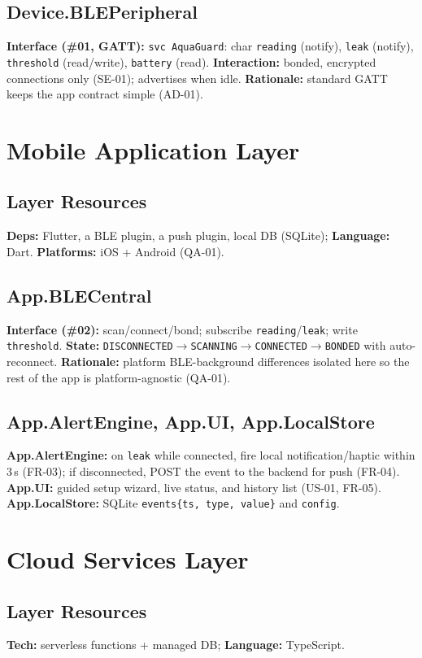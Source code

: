 \documentclass[11pt,letterpaper]{article}
\begin{document}
\subsection{Device.BLEPeripheral}
\textbf{Interface (\#01, GATT):} \texttt{svc AquaGuard}: char \texttt{reading}
(notify), \texttt{leak} (notify), \texttt{threshold} (read/write), \texttt{battery}
(read). \textbf{Interaction:} bonded, encrypted connections only (SE-01); advertises
when idle. \textbf{Rationale:} standard GATT keeps the app contract simple (AD-01).

\section{Mobile Application Layer}
\subsection{Layer Resources}
\textbf{Deps:} Flutter, a BLE plugin, a push plugin, local DB (SQLite);
\textbf{Language:} Dart. \textbf{Platforms:} iOS + Android (QA-01).
\subsection{App.BLECentral}
\textbf{Interface (\#02):} scan/connect/bond; subscribe \texttt{reading}/\texttt{leak};
write \texttt{threshold}. \textbf{State:}
\texttt{DISCONNECTED$\rightarrow$SCANNING$\rightarrow$CONNECTED$\rightarrow$BONDED}
with auto-reconnect. \textbf{Rationale:} platform BLE-background differences isolated
here so the rest of the app is platform-agnostic (QA-01).
\subsection{App.AlertEngine, App.UI, App.LocalStore}
\textbf{App.AlertEngine:} on \texttt{leak} while connected, fire local
notification/haptic within 3\,s (FR-03); if disconnected, POST the event to the
backend for push (FR-04). \textbf{App.UI:} guided setup wizard, live status, and
history list (US-01, FR-05). \textbf{App.LocalStore:} SQLite
\texttt{events\{ts, type, value\}} and \texttt{config}.

\section{Cloud Services Layer}
\subsection{Layer Resources}
\textbf{Tech:} serverless functions + managed DB; \textbf{Language:} TypeScript.
\end{document}
